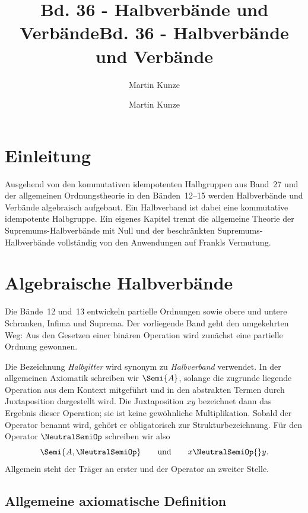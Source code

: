 \documentclass[main.tex]{subfiles}
\title{Bd. 36 - Halbverbände und Verbände}
\author{Martin Kunze}
\date{}
\begin{document}
\title{Bd. 36 - Halbverbände und Verbände}
\author{Martin Kunze}
\date{}
\hypersetup{pageanchor=false}
\maketitle
\hypersetup{pageanchor=true}
\setcounter{tocdepth}{3}
\tableofcontents
\setcounter{file}{36}
\renewcommand{\FormulaBandID}{36}
\newcommand{\ProofRefStack}[1]{%
  \ensuremath{\begin{gathered}#1\end{gathered}}}

\chapter{Einleitung}

Ausgehend von den kommutativen idempotenten Halbgruppen aus Band~27 und der allgemeinen Ordnungstheorie
in den Bänden~12--15 werden Halbverbände und Verbände algebraisch aufgebaut. Ein
Halbverband ist dabei eine kommutative idempotente Halbgruppe. Ein eigenes
Kapitel trennt
die allgemeine Theorie der Supremums-Halbverbände mit Null und der
beschränkten Supremums-Halbverbände vollständig von den Anwendungen auf
Frankls Vermutung.

\chapter{Algebraische Halbverbände}

Die Bände~12 und~13 entwickeln partielle Ordnungen sowie obere und untere Schranken,
Infima und Suprema. Der vorliegende Band geht den umgekehrten Weg: Aus den
Gesetzen einer binären Operation wird zunächst eine partielle Ordnung
gewonnen.

Die Bezeichnung \emph{Halbgitter} wird synonym zu \emph{Halbverband}
verwendet. In der allgemeinen Axiomatik schreiben wir \(\Semi{A}\), solange
die zugrunde liegende Operation aus dem Kontext mitgeführt und in den
abstrakten Termen durch Juxtaposition dargestellt wird. Die Juxtaposition
\(xy\) bezeichnet dann das Ergebnis dieser Operation; sie ist keine
gewöhnliche Multiplikation. Sobald der Operator benannt wird, gehört er
obligatorisch zur Strukturbezeichnung. Für den Operator \(\NeutralSemiOp\)
schreiben wir also
\[
  \Semi{A,\NeutralSemiOp}
  \qquad\text{und}\qquad
  x\NeutralSemiOp{}y.
\]
Allgemein steht der Träger an erster und der Operator an zweiter Stelle.

\section{Allgemeine axiomatische Definition}
\end{document}
